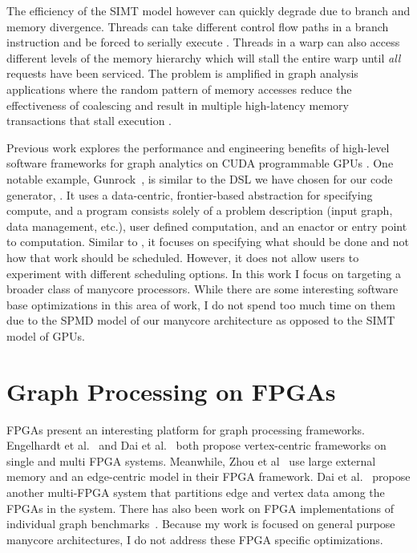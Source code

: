 The efficiency of the SIMT model however can quickly degrade due to branch and memory divergence. 
Threads can take different control flow paths in a branch instruction and be forced to serially execute \cite{fung2011thread}.
Threads in a warp can also access different levels of the memory hierarchy which will stall the entire warp until \textit{all} requests have been serviced.
The problem is amplified in graph analysis applications where the random pattern of memory accesses reduce the effectiveness of coalescing and result in multiple high-latency memory transactions that stall execution \cite{xu2014graph, shi2018graph}.

Previous work explores the performance and engineering benefits of high-level software frameworks for graph analytics on CUDA programmable GPUs \cite{wang2016gunrock, zhong2013medusa, nodehi2018tigr, yang2019graphblast, khorasani2014cusha}. 
One notable example, Gunrock~\cite{wang2016gunrock}, is similar to the DSL we have chosen for our code generator, \graphit. 
It uses a data-centric, frontier-based abstraction for specifying compute, and a program consists solely of a problem description (input graph, data management, etc.), user defined computation, and an enactor or entry point to computation.
Similar to \graphit, it focuses on specifying what should be done and not how that work should be scheduled. 
However, it does not allow users to experiment with different scheduling options.
In this work I focus on targeting a broader class of manycore processors.
While there are some interesting software base optimizations in this area of work, I do not spend too much time on them due to the SPMD model of our manycore architecture as opposed to the SIMT model of GPUs. 

\section{Graph Processing on FPGAs} FPGAs present an interesting platform for graph processing frameworks. Engelhardt et al.~\cite{engelhardt2016gravf} and Dai et al.~\cite{dai2016fpgp} both propose vertex-centric frameworks on single and multi FPGA systems.
Meanwhile, Zhou et al~\cite{zhou2016high} use large external memory and an edge-centric model in their FPGA framework. Dai et al.~\cite{dai2017foregraph} propose another multi-FPGA system that partitions edge and vertex data among the FPGAs in the system.
There has also been work on FPGA implementations of individual graph benchmarks~\cite{zhou2015optimizing, zhou2015accelerating}.
Because my work is focused on general purpose manycore architectures, I do not address these FPGA specific optimizations.

